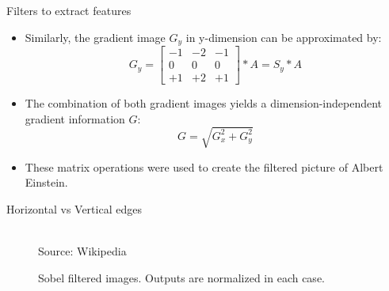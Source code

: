 \begin{vbframe}{Filters to extract features}
\begin{itemize}
    \end{itemize}
\framebreak
    \begin{itemize}
        \item Similarly, the gradient image $G_y$ in y-dimension can be approximated by:
        $$
            G_y = 
            \begin{bmatrix}
                -1 & -2 & -1  \\
                0 & 0 & 0 \\
                +1 & +2 & +1
            \end{bmatrix} * A = S_y * A
        $$
        \item The combination of both gradient images yields a dimension-independent gradient information $G$:
        $$
            G = \sqrt{G_x^2 + G_y^2}
        $$
        \item These matrix operations were used to create the filtered picture of Albert Einstein.
    \end{itemize}
\end{vbframe}

\begin{frame}{Horizontal vs Vertical edges}

    \begin{figure}
        \centering
          \tiny{\\ Source: Wikipedia}
         \caption{\footnotesize{Sobel filtered images. Outputs are normalized in each case. }}
    \end{figure}

\end{frame}

